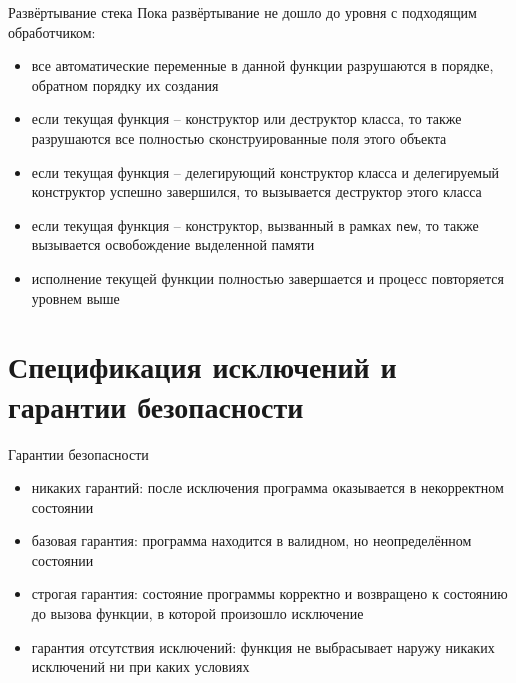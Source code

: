 \documentclass[unknownkeysallowed,xcolor=table]{beamer}
\begin{document}
\begin{frame}{Развёртывание стека}
  Пока развёртывание не дошло до уровня с подходящим обработчиком:
  \begin{itemize}
    \item все автоматические переменные в данной функции разрушаются в порядке, обратном порядку их создания
    \item если текущая функция -- конструктор или деструктор класса, то также разрушаются все полностью сконструированные поля этого объекта
    \item если текущая функция -- делегирующий конструктор класса и делегируемый конструктор успешно завершился, то вызывается деструктор этого класса
    \item если текущая функция -- конструктор, вызванный в рамках \lstinline{new}, то также вызывается освобождение выделенной памяти
    \item исполнение текущей функции полностью завершается и процесс повторяется уровнем выше
  \end{itemize}
\end{frame}

\section{Спецификация исключений и гарантии безопасности}

\begin{frame}{Гарантии безопасности}
  \begin{itemize}
    \item никаких гарантий: после исключения программа оказывается в некорректном состоянии \vspace{1em}
    \item базовая гарантия: программа находится в валидном, но неопределённом состоянии \vspace{1em}
    \item строгая гарантия: состояние программы корректно и возвращено к состоянию до вызова функции, в которой произошло исключение \vspace{1em}
    \item гарантия отсутствия исключений: функция не выбрасывает наружу никаких исключений ни при каких условиях
  \end{itemize}
\end{frame}
\end{document}
